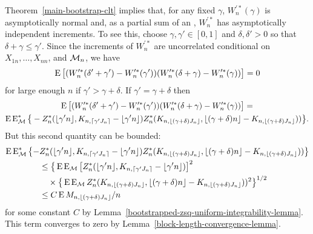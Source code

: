 \documentclass[11pt]{article}
\begin{document}
Theorem~\ref{main-bootstrap-clt} implies that, for any fixed $\gamma$,
$W_n^{\prime *}(\gamma)$ is asymptotically normal and, as a
partial sum of an \mds, $W_n^{\prime *}$ has asymptotically independent
increments. To see this, choose $\gamma, \gamma' \in [0,1]$ and
$\delta, \delta' > 0$ so that $\delta + \gamma \leq \gamma'$. Since
the increments of $W_n^{\prime *}$ are uncorrelated conditional on
$X_{1n},\dots,X_{nn}$, and $\mathcal{M}_n$, we have
\begin{equation*}
    \operatorname{E}\big[ (W_n^{\prime *}(\delta' + \gamma') - W_n^{\prime *}(\gamma'))
  (W_n^{\prime *}(\delta + \gamma) - W_n^{\prime *}(\gamma)) \big] = 0
\end{equation*}
for large enough $n$ if $\gamma' > \gamma + \delta$. If $\gamma' =
\gamma + \delta$ then
\begin{multline*}
  \operatorname{E}\big[(W_n^{\prime *}(\delta' + \gamma') - W_n^{\prime *}(\gamma'))
  (W_n^{\prime *}(\delta + \gamma) - W_n^{\prime *}(\gamma)) \big] = \\
  \operatorname{E} \operatorname{E}_{\mathcal{M}}^*\big\{- Z_n^*(\lfloor \gamma' n \rfloor, K_{n, \lceil \gamma' J_n \rceil }- \lfloor \gamma' n \rfloor)
  Z_n^*(K_{n,\lfloor (\gamma + \delta) J_n \rfloor},
  \lfloor (\gamma + \delta) n \rfloor - K_{n,\lfloor (\gamma + \delta) J_n \rfloor}))\big\}.
\end{multline*}
But this second quantity can be bounded:
\begin{align*}
  \operatorname{E} \operatorname{E}_{\mathcal{M}}^*\big\{-& Z_n^*(\lfloor \gamma' n \rfloor,
  K_{n, \lceil \gamma' J_n \rceil }- \lfloor \gamma' n \rfloor)
  Z_n^*(K_{n,\lfloor (\gamma + \delta) J_n \rfloor},
  \lfloor (\gamma + \delta) n \rfloor - K_{n,\lfloor (\gamma + \delta) J_n \rfloor}))\big\} \\
  &\leq \big\{\operatorname{E} \operatorname{E}_{\mathcal{M}}\big[Z_n^*(\lfloor \gamma' n \rfloor, K_{n, \lceil \gamma' J_n \rceil }- \lfloor \gamma' n \rfloor)\big]^2 \\
  & \quad \times \big\{\operatorname{E} \operatorname{E}_{\mathcal{M}} Z_n^*(K_{n,\lfloor (\gamma + \delta) J_n \rfloor},
  \lfloor (\gamma + \delta) n \rfloor - K_{n,\lfloor (\gamma + \delta) J_n \rfloor}))^2\big\}^{1/2} \\
  &\leq C \operatorname{E} M_{n, \lfloor (\gamma + \delta) J_n \rfloor} / n
\end{align*}
for some constant $C$ by
Lemma~\ref{bootstrapped-zsq-uniform-integrability-lemma}. This term
converges to zero by Lemma~\ref{block-length-convergence-lemma}.
\end{document}
